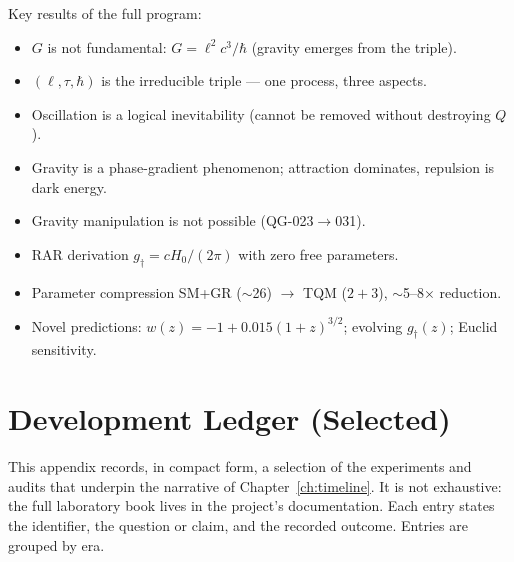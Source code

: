 \documentclass[10pt,twoside,openany]{book}
\begin{document}
Key results of the full program:
\begin{itemize}
\item $G$ is not fundamental: $G=\ell^2c^3/\hbar$ (gravity emerges from the triple).
\item $(\ell,\tau,\hbar)$ is the irreducible triple — one process, three aspects.
\item Oscillation is a logical inevitability (cannot be removed without destroying $Q$).
\item Gravity is a phase-gradient phenomenon; attraction dominates, repulsion is dark
energy.
\item Gravity manipulation is not possible (QG-023$\to$031).
\item RAR derivation $g_\dagger=cH_0/(2\pi)$ with zero free parameters.
\item Parameter compression SM+GR ($\sim$26) $\to$ TQM ($2{+}3$), $\sim$5--8$\times$
reduction.
\item Novel predictions: $w(z)=-1+0.015(1+z)^{3/2}$; evolving $g_\dagger(z)$; Euclid
sensitivity.
\end{itemize}

\chapter{Development Ledger (Selected)}
\label{app:ledger}

This appendix records, in compact form, a selection of the experiments and audits that
underpin the narrative of Chapter~\ref{ch:timeline}. It is not exhaustive: the full
laboratory book lives in the project's documentation. Each entry states the identifier,
the question or claim, and the recorded outcome. Entries are grouped by era.
\end{document}

